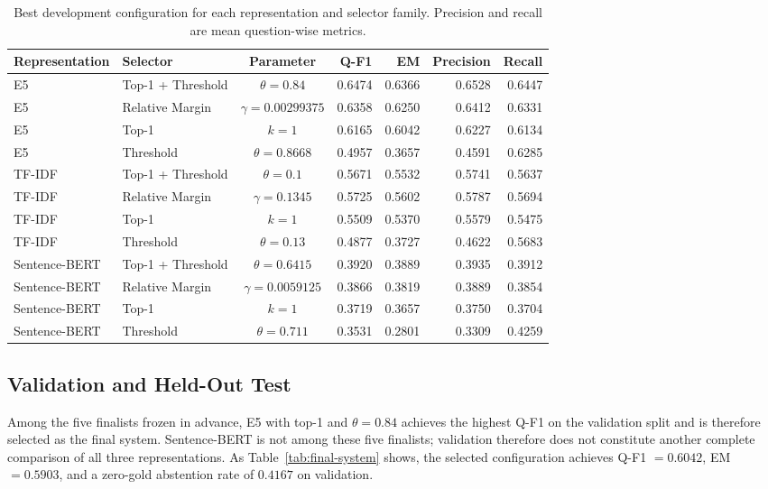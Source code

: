 \documentclass[11pt]{article}
\begin{document}
\begin{table}[t]
\centering
\small
\begin{tabular}{llcrrrr}
\toprule
\textbf{Representation} & \textbf{Selector} & \textbf{Parameter} & \textbf{Q-F1} & \textbf{EM} & \textbf{Precision} & \textbf{Recall} \\
\midrule
E5 & Top-1 + Threshold & $\theta=0.84$ & 0.6474 & 0.6366 & 0.6528 & 0.6447 \\
E5 & Relative Margin & $\gamma=0.00299375$ & 0.6358 & 0.6250 & 0.6412 & 0.6331 \\
E5 & Top-1 & $k=1$ & 0.6165 & 0.6042 & 0.6227 & 0.6134 \\
E5 & Threshold & $\theta=0.8668$ & 0.4957 & 0.3657 & 0.4591 & 0.6285 \\
TF-IDF & Top-1 + Threshold & $\theta=0.1$ & 0.5671 & 0.5532 & 0.5741 & 0.5637 \\
TF-IDF & Relative Margin & $\gamma=0.1345$ & 0.5725 & 0.5602 & 0.5787 & 0.5694 \\
TF-IDF & Top-1 & $k=1$ & 0.5509 & 0.5370 & 0.5579 & 0.5475 \\
TF-IDF & Threshold & $\theta=0.13$ & 0.4877 & 0.3727 & 0.4622 & 0.5683 \\
Sentence-BERT & Top-1 + Threshold & $\theta=0.6415$ & 0.3920 & 0.3889 & 0.3935 & 0.3912 \\
Sentence-BERT & Relative Margin & $\gamma=0.0059125$ & 0.3866 & 0.3819 & 0.3889 & 0.3854 \\
Sentence-BERT & Top-1 & $k=1$ & 0.3719 & 0.3657 & 0.3750 & 0.3704 \\
Sentence-BERT & Threshold & $\theta=0.711$ & 0.3531 & 0.2801 & 0.3309 & 0.4259 \\
\bottomrule
\end{tabular}
\caption{Best development configuration for each representation and selector family. Precision and recall are mean question-wise metrics.}
\label{tab:development-results}
\end{table}

\subsection{Validation and Held-Out Test}
\label{sec:validation-test}

Among the five finalists frozen in advance, E5 with top-1 and $\theta=0.84$ achieves the highest Q-F1 on the validation split and is therefore selected as the final system. Sentence-BERT is not among these five finalists; validation therefore does not constitute another complete comparison of all three representations. As Table~\ref{tab:final-system} shows, the selected configuration achieves Q-F1 $=0.6042$, EM $=0.5903$, and a zero-gold abstention rate of $0.4167$ on validation.
\end{document}
